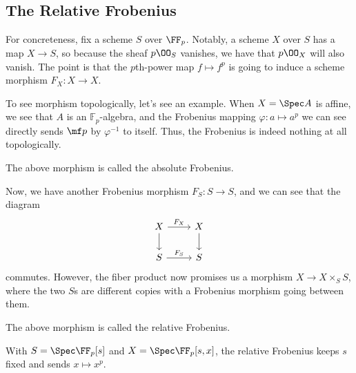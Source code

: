 \documentclass[../notes.tex]{subfiles}
\begin{document}
\subsection{The Relative Frobenius}
For concreteness, fix a scheme $S$ over $\FF_p$. Notably, a scheme $X$ over $S$ has a map $X\to S$, so because the sheaf $p\OO_S$ vanishes, we have that $p\OO_X$ will also vanish. The point is that the $p$th-power map $f\mapsto f^p$ is going to induce a scheme morphism $F_X\colon X\to X$.

To see morphism topologically, let's see an example. When $X=\Spec A$ is affine, we see that $A$ is an $\mathbb F_p$-algebra, and the Frobenius mapping $\varphi\colon a\mapsto a^p$ we can see directly sends $\mf p$ by $\varphi^{-1}$ to itself. Thus, the Frobenius is indeed nothing at all topologically.
\begin{remark}
	The above morphism is called the absolute Frobenius.
\end{remark}

Now, we have another Frobenius morphism $F_S\colon S\to S$, and we can see that the diagram
\[\begin{tikzcd}
	X & X \\
	S & S
	\arrow["{F_X}", from=1-1, to=1-2]
	\arrow["{F_S}", from=2-1, to=2-2]
	\arrow[from=1-1, to=2-1]
	\arrow[from=1-2, to=2-2]
\end{tikzcd}\]
commutes. However, the fiber product now promises us a morphism $X\to X\times_SS$, where the two $S$s are different copies with a Frobenius morphism going between them.
\begin{remark}
	The above morphism is called the relative Frobenius.
\end{remark}
\begin{example}
	With $S=\Spec\FF_p[s]$ and $X=\Spec\FF_p[s,x]$, the relative Frobenius keeps $s$ fixed and sends $x\mapsto x^p$.
\end{example}
\end{document}
